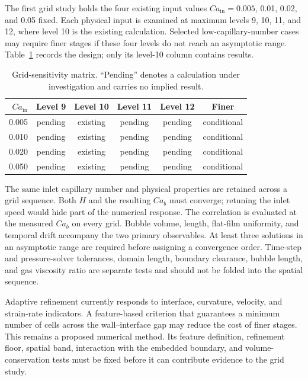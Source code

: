 \documentclass[11pt,a4paper]{article}
\begin{document}
The first grid study holds the four existing input values
$Ca_{\mathrm{in}}=0.005$, 0.01, 0.02, and 0.05 fixed. Each physical input is
examined at maximum levels 9, 10, 11, and 12, where level 10 is the existing
calculation. Selected low-capillary-number cases may require finer stages if
these four levels do not reach an asymptotic range. Table~\ref{tab:grid}
records the design; only its level-10 column contains results.

\begin{table}[t]
  \centering
  \caption{Grid-sensitivity matrix. ``Pending'' denotes a calculation under
  investigation and carries no implied result.}
  \label{tab:grid}
  \begin{tabular}{rccccc}
    \toprule
    $Ca_{\mathrm{in}}$ & Level 9 & Level 10 & Level 11 & Level 12 & Finer \\
    \midrule
    0.005 & pending & existing & pending & pending & conditional \\
    0.010 & pending & existing & pending & pending & conditional \\
    0.020 & pending & existing & pending & pending & conditional \\
    0.050 & pending & existing & pending & pending & conditional \\
    \bottomrule
  \end{tabular}
\end{table}

The same inlet capillary number and physical properties are retained across a
grid sequence. Both $H$ and the resulting $Ca_b$ must converge; retuning the
inlet speed would hide part of the numerical response. The correlation is
evaluated at the measured $Ca_b$ on every grid. Bubble volume, length, flat-film
uniformity, and temporal drift accompany the two primary observables. At
least three solutions in an asymptotic range are required before assigning a
convergence order. Time-step and pressure-solver tolerances, domain length,
boundary clearance, bubble length, and gas viscosity ratio are separate tests
and should not be folded into the spatial sequence.

Adaptive refinement currently responds to interface, curvature, velocity, and
strain-rate indicators. A feature-based criterion that guarantees a minimum
number of cells across the wall--interface gap may reduce the cost of finer
stages. This remains a proposed numerical method. Its feature definition,
refinement floor, spatial band, interaction with the embedded boundary, and
volume-conservation tests must be fixed before it can contribute evidence to
the grid study.
\end{document}
